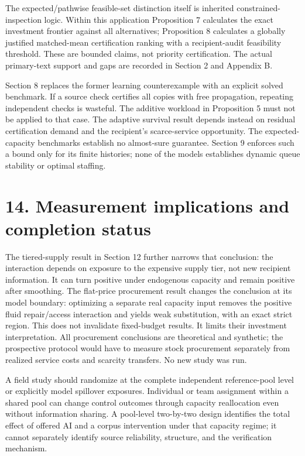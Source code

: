 \documentclass[
  11pt,
  a4paper,
]{article}
\begin{document}
The expected/pathwise feasible-set distinction itself is inherited
constrained-inspection logic. Within this application Proposition 7
calculates the exact investment frontier against all alternatives;
Proposition 8 calculates a globally justified matched-mean certification
ranking with a recipient-audit feasibility threshold. These are bounded
claims, not priority certification. The actual primary-text support and
gaps are recorded in Section 2 and Appendix B.

Section 8 replaces the former learning counterexample with an explicit
solved benchmark. If a source check certifies all copies with free
propagation, repeating independent checks is wasteful. The additive
workload in Proposition 5 must not be applied to that case. The adaptive
survival result depends instead on residual certification demand and the
recipient's scarce-service opportunity. The expected-capacity benchmarks
establish no almost-sure guarantee. Section 9 enforces such a bound only
for its finite histories; none of the models establishes dynamic queue
stability or optimal staffing.

\hypertarget{measurement-implications-and-completion-status}{%
\section{14. Measurement implications and completion
status}\label{measurement-implications-and-completion-status}}

The tiered-supply result in Section 12 further narrows that conclusion:
the interaction depends on exposure to the expensive supply tier, not
new recipient information. It can turn positive under endogenous
capacity and remain positive after smoothing. The flat-price procurement
result changes the conclusion at its model boundary: optimizing a
separate real capacity input removes the positive fluid repair/access
interaction and yields weak substitution, with an exact strict region.
This does not invalidate fixed-budget results. It limits their
investment interpretation. All procurement conclusions are theoretical
and synthetic; the prospective protocol would have to measure stock
procurement separately from realized service costs and scarcity
transfers. No new study was run.

A field study should randomize at the complete independent
reference-pool level or explicitly model spillover exposures. Individual
or team assignment within a shared pool can change control outcomes
through capacity reallocation even without information sharing. A
pool-level two-by-two design identifies the total effect of offered AI
and a corpus intervention under that capacity regime; it cannot
separately identify source reliability, structure, and the verification
mechanism.
\end{document}

